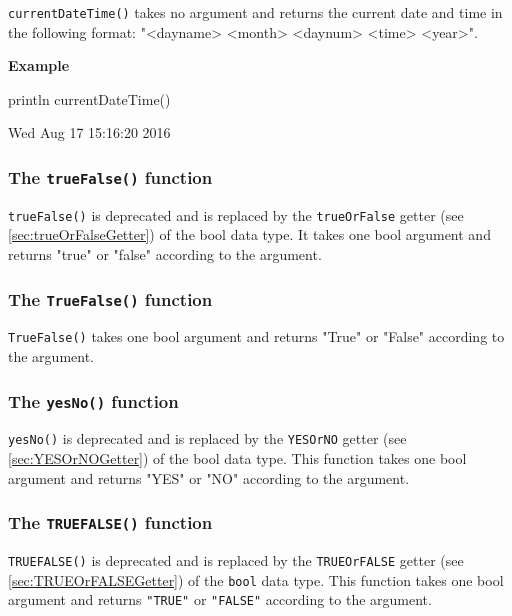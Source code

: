 \documentclass[10pt,openright,twosides,final]{memoir}
\newcommand{\gtltype}[1]{{\small\ttfamily #1}}
\newcommand{\scst}[1]{{\footnotesize\ttfamily\colorbox{light-blue}{"#1"}}}
\newcommand{\gtlinline}[1]{\colorbox{light-blue}{\lstinline[language=gtl]{#1}}}
\newcommand{\example}{\vspace{.75em}\noindent\textbf{Example}\vspace{0em}}
\begin{document}
\gtlinline{currentDateTime()} takes no argument and returns the current date and time in the following format: \scst{<dayname> <month> <daynum> <time> <year>}.

\example
\begin{gtl}
println currentDateTime()
\end{gtl}
\begin{console}
Wed Aug 17 15:16:20 2016
\end{console}

\subsubsection{The \texttt{trueFalse()} function}

\gtlinline{trueFalse()} is deprecated and is replaced by the \gtlinline{trueOrFalse} getter (see \ref{sec:trueOrFalseGetter}) of the \gtltype{bool} data type. It takes one bool argument and returns \scst{true} or \scst{false} according to the argument.

\subsubsection{The \texttt{TrueFalse()} function}

\gtlinline{TrueFalse()} takes one bool argument and returns \scst{True} or \scst{False} according to the argument.

\subsubsection{The \texttt{yesNo()} function}

\gtlinline{yesNo()} is deprecated and is replaced by the \gtlinline{YESOrNO} getter (see \ref{sec:YESOrNOGetter}) of the \gtltype{bool} data type. This function takes one bool argument and returns \scst{YES} or \scst{NO} according to the argument.

\subsubsection{The \texttt{TRUEFALSE()} function}

\gtlinline{TRUEFALSE()} is deprecated and is replaced by the \texttt{TRUEOrFALSE} getter (see \ref{sec:TRUEOrFALSEGetter})  of the \texttt{bool} data type. This function takes one bool argument and returns \texttt{"TRUE"} or \texttt{"FALSE"} according to the argument.
\end{document}
